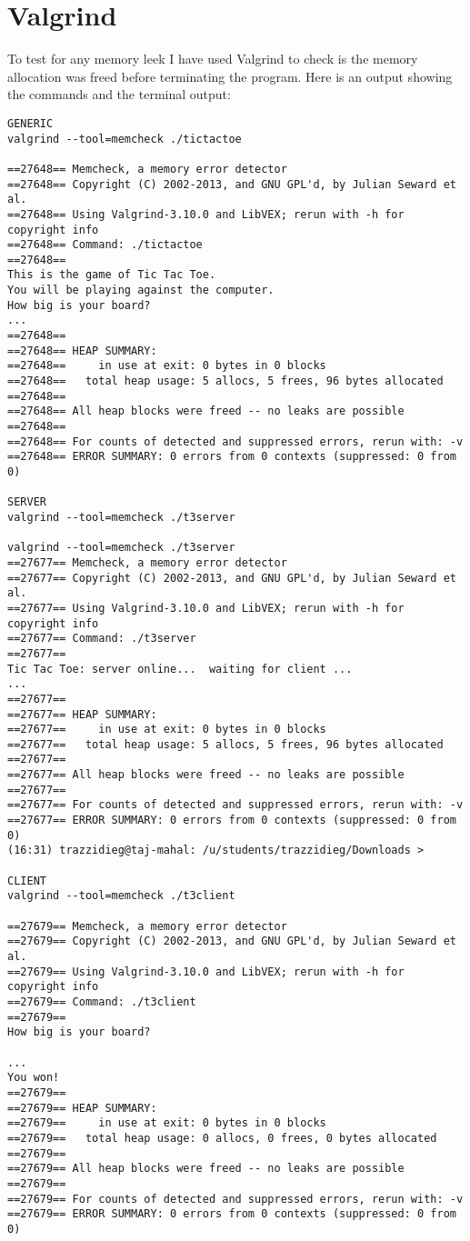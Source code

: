 \documentclass[11pt, oneside]{article} %
\begin{document}
\section{Valgrind}
To test for any memory leek I have used Valgrind to check is the memory allocation was freed before terminating the program. Here is an output showing the commands and the terminal output: 
\begin{lstlisting}
GENERIC
valgrind --tool=memcheck ./tictactoe

==27648== Memcheck, a memory error detector
==27648== Copyright (C) 2002-2013, and GNU GPL'd, by Julian Seward et al.
==27648== Using Valgrind-3.10.0 and LibVEX; rerun with -h for copyright info
==27648== Command: ./tictactoe
==27648== 
This is the game of Tic Tac Toe.
You will be playing against the computer.
How big is your board?
...
==27648== 
==27648== HEAP SUMMARY:
==27648==     in use at exit: 0 bytes in 0 blocks
==27648==   total heap usage: 5 allocs, 5 frees, 96 bytes allocated
==27648== 
==27648== All heap blocks were freed -- no leaks are possible
==27648== 
==27648== For counts of detected and suppressed errors, rerun with: -v
==27648== ERROR SUMMARY: 0 errors from 0 contexts (suppressed: 0 from 0)

SERVER
valgrind --tool=memcheck ./t3server

valgrind --tool=memcheck ./t3server
==27677== Memcheck, a memory error detector
==27677== Copyright (C) 2002-2013, and GNU GPL'd, by Julian Seward et al.
==27677== Using Valgrind-3.10.0 and LibVEX; rerun with -h for copyright info
==27677== Command: ./t3server
==27677== 
Tic Tac Toe: server online...  waiting for client ... 
...
==27677== 
==27677== HEAP SUMMARY:
==27677==     in use at exit: 0 bytes in 0 blocks
==27677==   total heap usage: 5 allocs, 5 frees, 96 bytes allocated
==27677== 
==27677== All heap blocks were freed -- no leaks are possible
==27677== 
==27677== For counts of detected and suppressed errors, rerun with: -v
==27677== ERROR SUMMARY: 0 errors from 0 contexts (suppressed: 0 from 0)
(16:31) trazzidieg@taj-mahal: /u/students/trazzidieg/Downloads > 

CLIENT
valgrind --tool=memcheck ./t3client

==27679== Memcheck, a memory error detector
==27679== Copyright (C) 2002-2013, and GNU GPL'd, by Julian Seward et al.
==27679== Using Valgrind-3.10.0 and LibVEX; rerun with -h for copyright info
==27679== Command: ./t3client
==27679== 
How big is your board?

...
You won!
==27679== 
==27679== HEAP SUMMARY:
==27679==     in use at exit: 0 bytes in 0 blocks
==27679==   total heap usage: 0 allocs, 0 frees, 0 bytes allocated
==27679== 
==27679== All heap blocks were freed -- no leaks are possible
==27679== 
==27679== For counts of detected and suppressed errors, rerun with: -v
==27679== ERROR SUMMARY: 0 errors from 0 contexts (suppressed: 0 from 0)\end{lstlisting}
\end{document}
